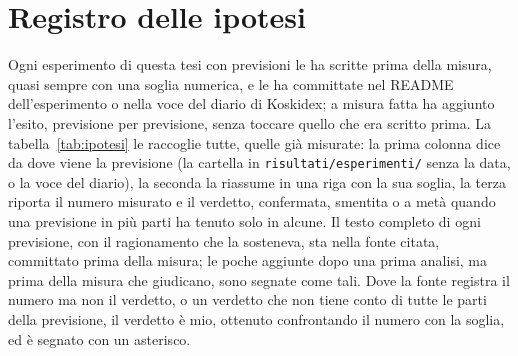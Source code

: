 \chapter{Registro delle ipotesi}\label{chapter:appendice-ipotesi}

Ogni esperimento di questa tesi con previsioni le ha scritte prima della
misura, quasi sempre con una soglia numerica, e le ha committate nel README dell'esperimento o nella
voce del diario di Koskidex; a misura fatta ha aggiunto l'esito, previsione per
previsione, senza toccare quello che era scritto prima. La
tabella~\ref{tab:ipotesi} le raccoglie tutte, quelle già misurate: la prima colonna dice da dove
viene la previsione (la cartella in \texttt{risultati/esperimenti/} senza la
data, o la voce del diario), la seconda la riassume in una riga con la sua
soglia, la terza riporta il numero misurato e il verdetto, confermata, smentita
o a metà quando una previsione in più parti ha tenuto solo in alcune. Il testo
completo di ogni previsione, con il ragionamento che la sosteneva, sta nella
fonte citata, committato prima della misura; le poche aggiunte dopo una prima
analisi, ma prima della misura che giudicano, sono segnate come tali. Dove la
fonte registra il numero ma non il verdetto, o un verdetto che non tiene conto
di tutte le parti della previsione, il verdetto è mio, ottenuto confrontando il
numero con la soglia, ed è segnato con un asterisco.

